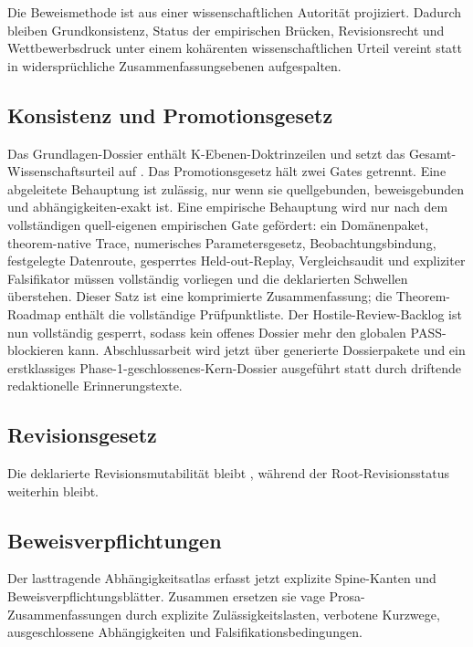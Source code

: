 Die Beweismethode ist aus einer wissenschaftlichen Autorität projiziert. Dadurch bleiben Grundkonsistenz, Status der empirischen Brücken, Revisionsrecht und Wettbewerbsdruck unter einem kohärenten wissenschaftlichen Urteil vereint statt in widersprüchliche Zusammenfassungsebenen aufgespalten.

\subsection{Konsistenz und Promotionsgesetz}
Das Grundlagen-Dossier enthält  K-Ebenen-Doktrinzeilen und setzt das Gesamt-Wissenschaftsurteil auf .
Das Promotionsgesetz hält zwei Gates getrennt. Eine abgeleitete Behauptung ist zulässig, nur wenn sie quellgebunden, beweisgebunden und abhängigkeiten-exakt ist. Eine empirische Behauptung wird nur nach dem vollständigen quell-eigenen empirischen Gate gefördert: ein Domänenpaket, theorem-native Trace, numerisches Parametersgesetz, Beobachtungsbindung, festgelegte Datenroute, gesperrtes Held-out-Replay, Vergleichsaudit und expliziter Falsifikator müssen vollständig vorliegen und die deklarierten Schwellen überstehen. Dieser Satz ist eine komprimierte Zusammenfassung; die Theorem-Roadmap enthält die vollständige Prüfpunktliste.
Der Hostile-Review-Backlog ist nun vollständig gesperrt, sodass kein offenes Dossier mehr den globalen PASS-blockieren kann.
Abschlussarbeit wird jetzt über generierte Dossierpakete und ein erstklassiges Phase-1-geschlossenes-Kern-Dossier ausgeführt statt durch driftende redaktionelle Erinnerungstexte.

\subsection{Revisionsgesetz}
Die deklarierte Revisionsmutabilität bleibt , während der Root-Revisionsstatus weiterhin  bleibt.

\subsection{Beweisverpflichtungen}
Der lasttragende Abhängigkeitsatlas erfasst jetzt  explizite Spine-Kanten und  Beweisverpflichtungsblätter. Zusammen ersetzen sie vage Prosa-Zusammenfassungen durch explizite Zulässigkeitslasten, verbotene Kurzwege, ausgeschlossene Abhängigkeiten und Falsifikationsbedingungen.

